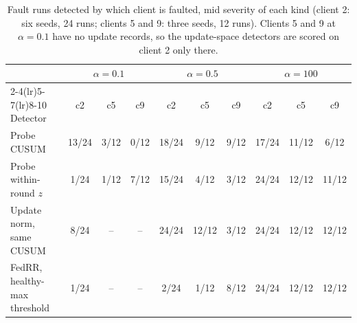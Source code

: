 \begin{table}[t]
\centering
\small
\setlength{\tabcolsep}{4pt}
\begin{tabular}{lccccccccc}
\toprule
 & \multicolumn{3}{c}{$\alpha = 0.1$} & \multicolumn{3}{c}{$\alpha = 0.5$} & \multicolumn{3}{c}{$\alpha = 100$} \\
\cmidrule(lr){2-4}\cmidrule(lr){5-7}\cmidrule(lr){8-10}
Detector & c2 & c5 & c9 & c2 & c5 & c9 & c2 & c5 & c9 \\
\midrule
Probe CUSUM & 13/24 & 3/12 & 0/12 & 18/24 & 9/12 & 9/12 & 17/24 & 11/12 & 6/12 \\
Probe within-round $z$ & 1/24 & 1/12 & 7/12 & 15/24 & 4/12 & 3/12 & 24/24 & 12/12 & 11/12 \\
Update norm, same CUSUM & 8/24 & -- & -- & 24/24 & 12/12 & 3/12 & 24/24 & 12/12 & 12/12 \\
FedRR, healthy-max threshold & 1/24 & -- & -- & 2/24 & 1/12 & 8/12 & 24/24 & 12/12 & 12/12 \\
\bottomrule
\end{tabular}
\caption{Fault runs detected by which client is faulted, mid severity of each kind (client 2: six seeds, 24 runs; clients 5 and 9: three seeds, 12 runs). Clients 5 and 9 at $\alpha = 0.1$ have no update records, so the update-space detectors are scored on client 2 only there.}
\label{tab:clients}
\end{table}
